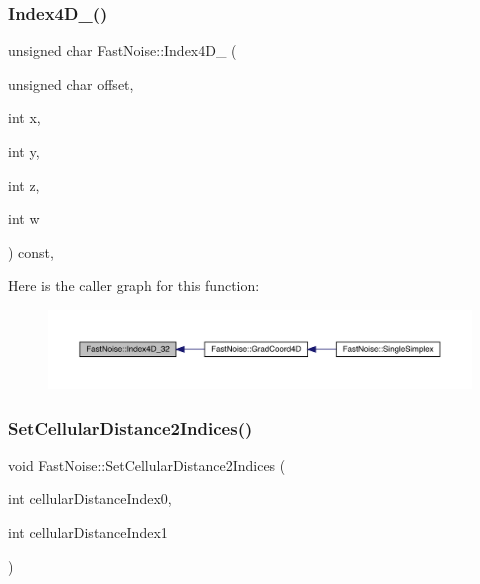 \mbox{\label{class_fast_noise_a00c08735b1ca018af621a1297964a547}} 
\subsubsection{\texorpdfstring{Index4\+D\+\_()}{Index4D\_32()}}
{\footnotesize\ttfamily unsigned char Fast\+Noise\+::\+Index4\+D\+\_ (\begin{DoxyParamCaption}\item[{unsigned char}]{offset,  }\item[{int}]{x,  }\item[{int}]{y,  }\item[{int}]{z,  }\item[{int}]{w }\end{DoxyParamCaption}) const\hspace{0.3cm}{\ttfamily [inline]}, {\ttfamily [private]}}

Here is the caller graph for this function\+:
\nopagebreak
\begin{figure}[H]
\begin{center}
\leavevmode
\includegraphics[width=350pt]{d1/dd8/class_fast_noise_a00c08735b1ca018af621a1297964a547_icgraph}
\end{center}
\end{figure}
\mbox{\label{class_fast_noise_afcd4ef6ef500424eea447449bd1eac8b}} 
\subsubsection{\texorpdfstring{Set\+Cellular\+Distance2\+Indices()}{SetCellularDistance2Indices()}}
{\footnotesize\ttfamily void Fast\+Noise\+::\+Set\+Cellular\+Distance2\+Indices (\begin{DoxyParamCaption}\item[{int}]{cellular\+Distance\+Index0,  }\item[{int}]{cellular\+Distance\+Index1 }\end{DoxyParamCaption})}

